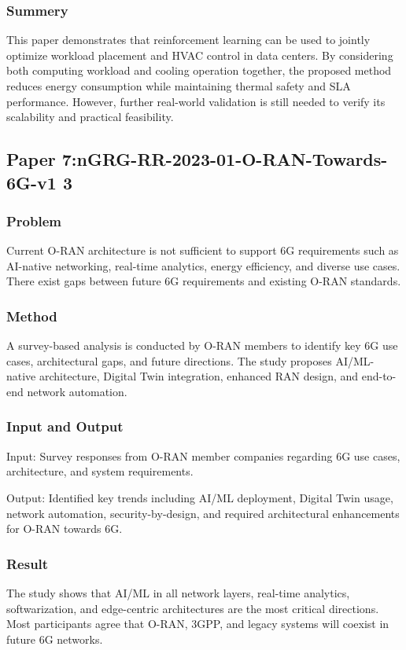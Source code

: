 \documentclass[12pt,a4paper]{article}
\begin{document}
    \subsubsection{Summery}
    This paper demonstrates that reinforcement learning can be used to jointly optimize workload placement and HVAC control in data centers. By considering both computing workload and cooling operation together, the proposed method reduces energy consumption while maintaining thermal safety and SLA performance. However, further real-world validation is still needed to verify its scalability and practical feasibility.
    
\newpage

\subsection{Paper 7:nGRG-RR-2023-01-O-RAN-Towards-6G-v1 3}
    \subsubsection{Problem}
    Current O-RAN architecture is not sufficient to support 6G requirements such as AI-native networking, real-time analytics, energy efficiency, and diverse use cases. There exist gaps between future 6G requirements and existing O-RAN standards.

    \subsubsection{Method}
    A survey-based analysis is conducted by O-RAN members to identify key 6G use cases, architectural gaps, and future directions. The study proposes AI/ML-native architecture, Digital Twin integration, enhanced RAN design, and end-to-end network automation.

    \subsubsection{Input and Output}
                Input:
                Survey responses from O-RAN member companies regarding 6G use cases, architecture, and system requirements.
                
                Output:
                Identified key trends including AI/ML deployment, Digital Twin usage, network automation, security-by-design, and required architectural enhancements for O-RAN towards 6G.

    \subsubsection{Result}
    The study shows that AI/ML in all network layers, real-time analytics, softwarization, and edge-centric architectures are the most critical directions. Most participants agree that O-RAN, 3GPP, and legacy systems will coexist in future 6G networks.
\end{document}
